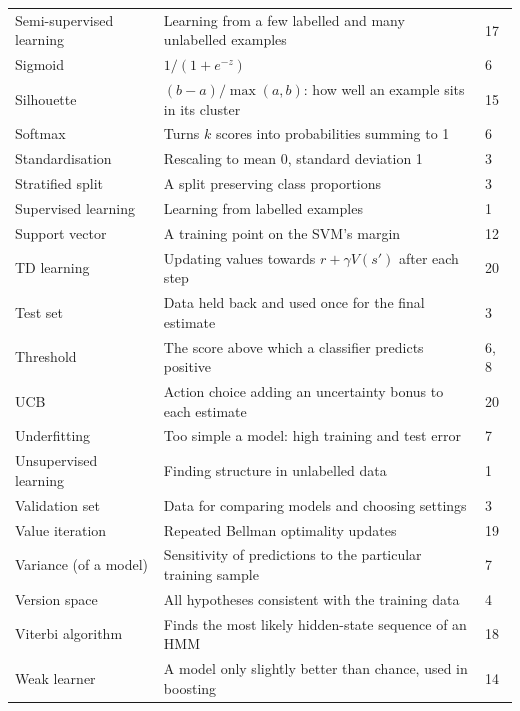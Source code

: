 \begin{longtable}{@{}L{3.9cm}L{9.9cm}L{1.1cm}@{}}
Semi-supervised learning & Learning from a few labelled and many unlabelled examples & 17 \\
Sigmoid & $1/(1 + e^{-z})$ & 6 \\
Silhouette & $(b - a)/\max(a, b)$: how well an example sits in its cluster & 15 \\
Softmax & Turns $k$ scores into probabilities summing to 1 & 6 \\
Standardisation & Rescaling to mean 0, standard deviation 1 & 3 \\
Stratified split & A split preserving class proportions & 3 \\
Supervised learning & Learning from labelled examples & 1 \\
Support vector & A training point on the SVM's margin & 12 \\
TD learning & Updating values towards $r + \gamma V(s')$ after each step & 20 \\
Test set & Data held back and used once for the final estimate & 3 \\
Threshold & The score above which a classifier predicts positive & 6, 8 \\
UCB & Action choice adding an uncertainty bonus to each estimate & 20 \\
Underfitting & Too simple a model: high training and test error & 7 \\
Unsupervised learning & Finding structure in unlabelled data & 1 \\
Validation set & Data for comparing models and choosing settings & 3 \\
Value iteration & Repeated Bellman optimality updates & 19 \\
Variance (of a model) & Sensitivity of predictions to the particular training sample & 7 \\
Version space & All hypotheses consistent with the training data & 4 \\
Viterbi algorithm & Finds the most likely hidden-state sequence of an HMM & 18 \\
Weak learner & A model only slightly better than chance, used in boosting & 14 \\
\bottomrule
\end{longtable}
